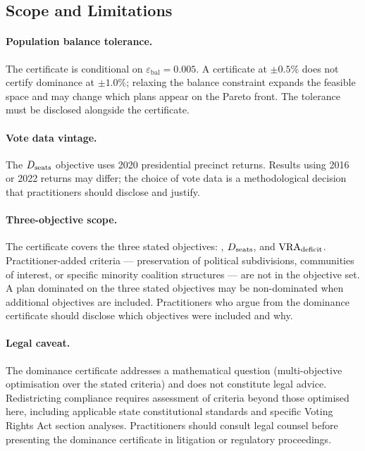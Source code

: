 \subsection{Scope and Limitations}

\paragraph{Population balance tolerance.}
The certificate is conditional on $\varepsilon_{\mathrm{bal}} = 0.005$.
A certificate at $\pm 0.5\%$ does not certify dominance at $\pm 1.0\%$;
relaxing the balance constraint expands the feasible space and may change
which plans appear on the Pareto front.
The tolerance must be disclosed alongside the certificate.

\paragraph{Vote data vintage.}
The $D_{\mathrm{seats}}$ objective uses 2020 presidential precinct returns.
Results using 2016 or 2022 returns may differ; the choice of vote data is
a methodological decision that practitioners should disclose and justify.

\paragraph{Three-objective scope.}
The certificate covers the three stated objectives: \EC{}, $D_{\mathrm{seats}}$, and
$\mathrm{VRA}_{\mathrm{deficit}}$.
Practitioner-added criteria --- preservation of political subdivisions,
communities of interest, or specific minority coalition structures ---
are not in the objective set.
A plan dominated on the three stated objectives may be non-dominated when
additional objectives are included.
Practitioners who argue from the dominance certificate should disclose
which objectives were included and why.

\paragraph{Legal caveat.}
The dominance certificate addresses a mathematical question (multi-objective
optimisation over the stated criteria) and does not constitute legal advice.
Redistricting compliance requires assessment of criteria beyond those
optimised here, including applicable state constitutional standards and
specific Voting Rights Act section analyses.
Practitioners should consult legal counsel before presenting the dominance
certificate in litigation or regulatory proceedings.
